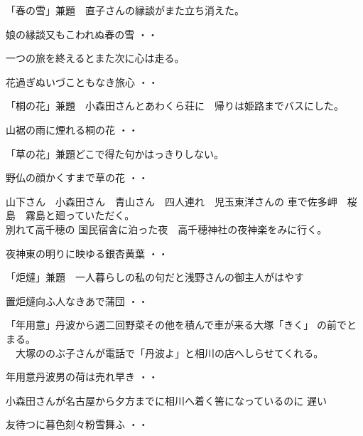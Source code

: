 \documentclass[b5paper]{tbook}
\begin{document}
\vspace{0.6cm}
「春の雪」兼題　直子さんの縁談がまた立ち消えた。
\begin{shiika}娘の縁談又もこわれぬ春の雪
\hfill{・・}\end{shiika}

\vspace{0.6cm}
一つの旅を終えるとまた次に心は走る。
\begin{shiika}花過ぎぬいづこともなき旅心
\hfill{・・}\end{shiika}
\vspace{0.6cm}
「桐の花」兼題　小森田さんとあわくら荘に　帰りは姫路までバスにした。
\begin{shiika}山裾の雨に煙れる桐の花
\hfill{・・}\end{shiika}
\vspace{0.6cm}
「草の花」兼題どこで得た句かはっきりしない。
\begin{shiika}野仏の顔かくすまで草の花
\hfill{・・}\end{shiika}
\vspace{0.6cm}
山下さん　小森田さん　青山さん　四人連れ　児玉東洋さんの
車で佐多岬　桜島　霧島と廻っていただく。\\別れて高千穂の
国民宿舎に泊った夜　高千穂神社の夜神楽をみに行く。
\begin{shiika}夜神東の明りに映ゆる銀杏黄葉
\hfill{・・}\end{shiika}
\vspace{0.6cm}
「炬燵」兼題　一人暮らしの私の句だと浅野さんの御主人がはやす
\begin{shiika}置炬燵向ふ人なきあで蒲団
\hfill{・・}\end{shiika}
\vspace{0.6cm}
「年用意」丹波から週二回野菜その他を積んで車が来る大塚「きく」
の前でとまる。\\　大塚ののぶ子さんが電話で「丹波よ」と相川の店へしらせてくれる。
\begin{shiika}年用意丹波男の荷は売れ早き
\hfill{・・}\end{shiika}
\vspace{0.6cm}
\vspace{0.6cm}
小森田さんが名古屋から夕方までに相川へ着く筈になっているのに
遅い
\begin{shiika}友待つに暮色刻々粉雪舞ふ
\hfill{・・}\end{shiika}
\end{document}
